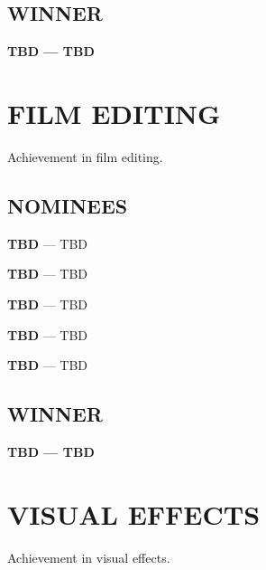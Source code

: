 \documentclass[letterpaper]{extarticle}
\begin{document}
  \subsection*{{\selectfont WINNER}}
  \textcolor{oscaryellow}{\textbf{{\selectfont TBD} — TBD}}

  \section*{\textcolor{oscaryellow}{{\selectfont FILM EDITING}}}
  \vspace{-6pt}
  {\selectfont Achievement in film editing.}
  \subsection*{{\selectfont NOMINEES}}
  \begin{multicols}{2}
    \begin{itemize}
      \begin{small}
        \item \textbf{{\selectfont TBD}} — TBD
        \item \textbf{{\selectfont TBD}} — TBD
        \item \textbf{{\selectfont TBD}} — TBD
        \item \textbf{{\selectfont TBD}} — TBD
        \item \textbf{{\selectfont TBD}} — TBD
      \end{small}
    \end{itemize}
  \end{multicols}

  \subsection*{{\selectfont WINNER}}
  \textcolor{oscaryellow}{\textbf{{\selectfont TBD} — TBD}}

  \section*{\textcolor{oscaryellow}{{\selectfont VISUAL EFFECTS}}}
  \vspace{-6pt}
  {\selectfont Achievement in visual effects.}
\end{document}
